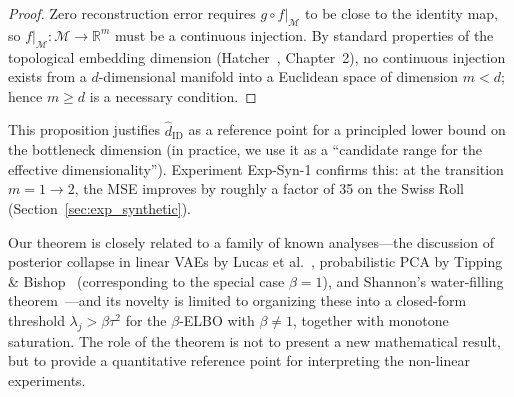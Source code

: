 \documentclass[make,article,submit,pdftex,moreauthors]{Definitions/mdpi}
\newcommand{\R}{\mathbb{R}}
\begin{document}
\begin{proof}
Zero reconstruction error requires $g \circ f|_\mathcal{M}$ to be close to the identity map,
so $f|_\mathcal{M}: \mathcal{M} \to \R^m$ must be a continuous injection.
By standard properties of the topological embedding dimension
(Hatcher~\cite{hatcher2002algebraic}, Chapter~2), no continuous injection exists from a
$d$-dimensional manifold into a Euclidean space of dimension $m < d$;
hence $m \geq d$ is a necessary condition.
\end{proof}

This proposition justifies $\hat{d}_\mathrm{ID}$ as a reference point for a principled
lower bound on the bottleneck dimension
(in practice, we use it as a ``candidate range for the effective dimensionality'').
Experiment Exp-Syn-1 confirms this: at the transition $m = 1 \to 2$, the MSE improves by
roughly a factor of 35 on the Swiss Roll (Section~\ref{sec:exp_synthetic}).

\begin{Remark}
Our theorem is closely related to a family of known analyses---the discussion of
posterior collapse in linear VAEs by Lucas et al.~\cite{lucas2019elbo},
probabilistic PCA by Tipping \& Bishop~\cite{tippingbishop1999ppca}
(corresponding to the special case $\beta = 1$), and Shannon's water-filling
theorem~\cite{cover2006elements}---and its novelty is limited to organizing these
into a closed-form threshold $\lambda_j > \beta\tau^2$ for the $\beta$-ELBO with
$\beta \neq 1$, together with monotone saturation.
The role of the theorem is not to present a new mathematical result, but to
provide a quantitative reference point for interpreting the non-linear
experiments.
\end{Remark}
\end{document}
